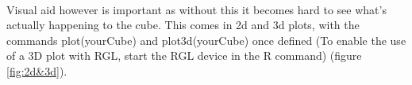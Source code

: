 \documentclass{article}
\begin{document}
\paragraph{}
Visual aid however is important as without this it becomes hard to see what's actually happening to the cube. This comes in 2d and 3d plots, with the commands plot(yourCube) and plot3d(yourCube) once defined (To enable the use of a 3D plot with RGL, start the RGL device in the R command) (figure \ref{fig:2d&3d}).
\end{document}
